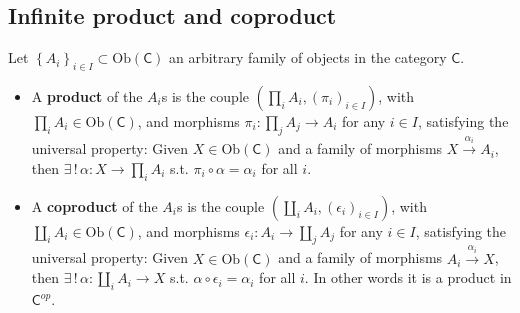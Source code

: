 \subsection{Infinite product and coproduct}

\begin{defn}
	Let $\left\{ A_i \right\}_{i \in I} \subset \mathrm{Ob} \left(\mathsf{C}\right)$ an arbitrary family of objects in the category $\mathsf{C}$.
	 \begin{itemize}
		 \item A \textbf{product} of the $A_i$s is the couple $\left(\prod_i A_i, (\pi_i)_{i \in I} \right)$, with $\prod_i A_i \in \mathrm{Ob} \left(\mathsf{C}\right)$, and morphisms $\pi_i: \prod_j A_j \to A_i$ for any $i \in I$, satisfying the universal property:
			 Given $X \in \mathrm{Ob} \left(\mathsf{C}\right)$ and a family of morphisms $X \xrightarrow{\alpha_i} A_i$, then $\exists\, !\, \alpha: X \to \prod_i A_i$ s.t. $\pi_i \circ \alpha = \alpha_i$ for all $i$.
		 \item A \textbf{coproduct} of the $A_i$s is the couple $\left(\coprod_i A_i, (\epsilon_i)_{i \in I} \right)$, with $\coprod_i A_i \in \mathrm{Ob} \left(\mathsf{C}\right)$, and morphisms $\epsilon_i: A_i \to \coprod_j A_j$ for any $i \in I$, satisfying the universal property:
			 Given $X \in \mathrm{Ob} \left(\mathsf{C}\right)$ and a family of morphisms $A_i \xrightarrow{\alpha_i} X$, then $\exists\, !\, \alpha: \coprod_i A_i \to X$ s.t. $\alpha \circ \epsilon_i = \alpha_i$ for all $i$.
			 In other words it is a product in $\mathsf{C}^{op}$.
	\end{itemize}
\end{defn}
 
